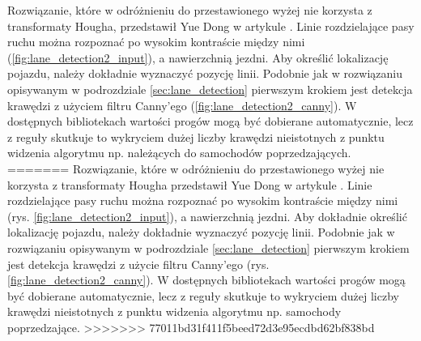 Rozwiązanie, które w odróżnieniu do przestawionego wyżej nie korzysta z transformaty Hougha, przedstawił Yue Dong w artykule \cite{T6}.
Linie rozdzielające pasy ruchu można rozpoznać po wysokim kontraście między nimi (\ref{fig:lane_detection2_input}), a nawierzchnią jezdni. 
Aby określić lokalizację pojazdu, należy dokładnie wyznaczyć pozycję linii. 
Podobnie jak w rozwiązaniu opisywanym w podrozdziale \ref{sec:lane_detection} pierwszym krokiem jest detekcja krawędzi z użyciem filtru Canny'ego (\ref{fig:lane_detection2_canny}). 
W dostępnych bibliotekach wartości progów mogą być dobierane automatycznie, lecz z reguły skutkuje to wykryciem dużej liczby krawędzi nieistotnych z punktu widzenia algorytmu np. należących do samochodów poprzedzających.
=======
Rozwiązanie, które w odróżnieniu do przestawionego wyżej nie korzysta z transformaty Hougha przedstawił Yue Dong w artykule \cite{T6}.
Linie rozdzielające pasy ruchu można rozpoznać po wysokim kontraście między nimi (rys. \ref{fig:lane_detection2_input}), a nawierzchnią jezdni. Aby dokładnie określić lokalizację pojazdu, należy dokładnie wyznaczyć pozycję linii. 
Podobnie jak w rozwiązaniu opisywanym w podrozdziale \ref{sec:lane_detection} pierwszym krokiem jest detekcja krawędzi z użycie filtru Canny'ego (rys. \ref{fig:lane_detection2_canny}). W dostępnych bibliotekach wartości progów mogą być dobierane automatycznie, lecz z reguły skutkuje to wykryciem dużej liczby krawędzi nieistotnych z punktu widzenia algorytmu np. samochody poprzedzające.
>>>>>>> 77011bd31f411f5beed72d3e95ecdbd62bf838bd

